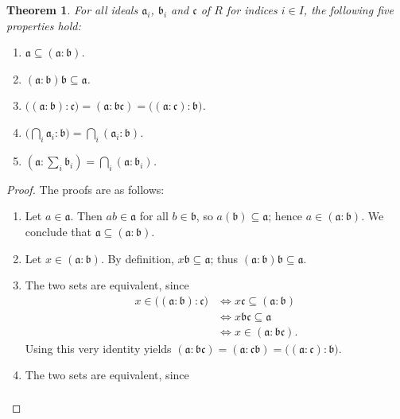 \documentclass[11pt]{article}
\newtheorem{theorem}{Theorem}
\begin{document}
\begin{adjustwidth}{0.5cm}{}
	\begin{theorem}
		For all ideals $\mathfrak{a}_{i}$, $\mathfrak{b}_{i}$ and $\mathfrak{c}$ of $R$ for indices $i \in I$, the following five properties hold:
		\begin{enumerate}
			\item $\mathfrak{a} \subseteq (\mathfrak{a} : \mathfrak{b})$.
			\item $(\mathfrak{a} : \mathfrak{b}) \mathfrak{b} \subseteq \mathfrak{a}$.
			\item $\big( (\mathfrak{a} : \mathfrak{b}) : \mathfrak{c} \big) = (\mathfrak{a} : \mathfrak{bc}) = \big( (\mathfrak{a} : \mathfrak{c}) : \mathfrak{b} \big)$.
			\item $\big( \bigcap_{i} \mathfrak{a}_{i} : \mathfrak{b} \big) = \bigcap_{i} (\mathfrak{a}_{i} : \mathfrak{b})$.
			\item $\left( \mathfrak{a} : \sum_{i} \mathfrak{b}_{i} \right) = \bigcap_{i} (\mathfrak{a} : \mathfrak{b}_{i})$.
		\end{enumerate}
	\end{theorem}
	\begin{proof}
		The proofs are as follows:
		\begin{enumerate}
			\item Let $a \in \mathfrak{a}$. Then $ab \in \mathfrak{a}$ for all $b \in \mathfrak{b}$, so $a(\mathfrak{b}) \subseteq \mathfrak{a}$; hence $a \in (\mathfrak{a} : \mathfrak{b})$. We conclude that $\mathfrak{a} \subseteq (\mathfrak{a} : \mathfrak{b})$.
			\item Let $x \in (\mathfrak{a} : \mathfrak{b})$. By definition, $x \mathfrak{b} \subseteq \mathfrak{a}$; thus $(\mathfrak{a} : \mathfrak{b}) \mathfrak{b} \subseteq \mathfrak{a}$.
			\item The two sets are equivalent, since 
			\begin{align*}
				x \in \big( (\mathfrak{a} : \mathfrak{b}) : \mathfrak{c} \big) &\iff x \mathfrak{c} \subseteq (\mathfrak{a} : \mathfrak{b}) \\
				&\iff x \mathfrak{bc} \subseteq \mathfrak{a} \\
				&\iff x \in (\mathfrak{a} : \mathfrak{bc}).
			\end{align*}
			Using this very identity yields $(\mathfrak{a} : \mathfrak{bc}) = (\mathfrak{a} : \mathfrak{cb}) = \big( (\mathfrak{a} : \mathfrak{c}) : \mathfrak{b} \big)$.
			\item The two sets are equivalent, since
			\begin{align*}

\end{align*}
\end{enumerate}
\end{proof}
\end{adjustwidth}
\end{document}
